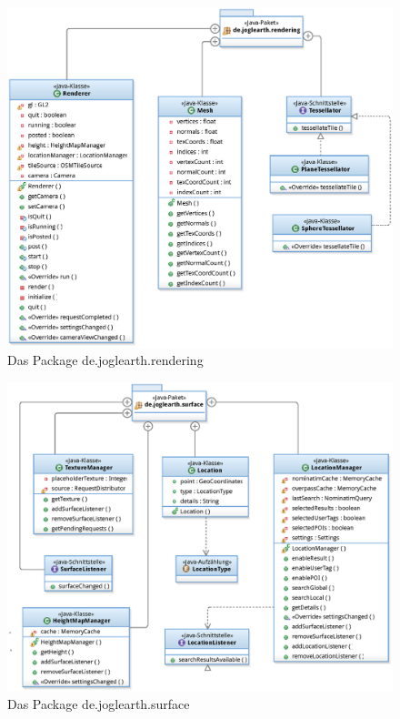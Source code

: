 \documentclass[10pt]{scrreprt}
\begin{document}
\begin{figure}[!htb]
\begin{center}
	\includegraphics[scale=0.55]{de_joglearth_rendering.eps}
\end{center}
\caption{Das Package de.joglearth.rendering}
\end{figure}

\begin{figure}[!htb]
\begin{center}
	\includegraphics[scale=0.55]{de_joglearth_surface.eps}
\end{center}
\caption{Das Package de.joglearth.surface}
\end{figure}
\end{document}
